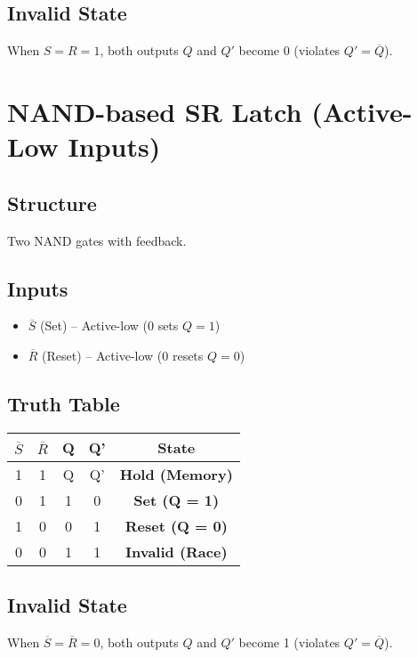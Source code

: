 \documentclass{article}
\begin{document}
\subsection{Invalid State}
When \( S = R = 1 \), both outputs \( Q \) and \( Q' \) become 0 (violates \( Q' = \overline{Q} \)).

\section{NAND-based SR Latch (Active-Low Inputs)}
\subsection{Structure}
Two NAND gates with feedback.

\subsection{Inputs}
\begin{itemize}
    \item \(\overline{S}\) (Set) – Active-low (0 sets \( Q = 1 \))
    \item \(\overline{R}\) (Reset) – Active-low (0 resets \( Q = 0 \))
\end{itemize}

\subsection{Truth Table}
\begin{center}
\begin{tabular}{ccccc}
\toprule
\(\overline{S}\) & \(\overline{R}\) & Q & Q' & \textbf{State} \\
\midrule
1 & 1 & Q & Q' & \textbf{Hold (Memory)} \\
0 & 1 & 1 & 0 & \textbf{Set (Q = 1)} \\
1 & 0 & 0 & 1 & \textbf{Reset (Q = 0)} \\
0 & 0 & 1 & 1 & \textbf{Invalid (Race)} \\
\bottomrule
\end{tabular}
\end{center}

\subsection{Invalid State}
When \( \overline{S} = \overline{R} = 0 \), both outputs \( Q \) and \( Q' \) become 1 (violates \( Q' = \overline{Q} \)).
\end{document}
